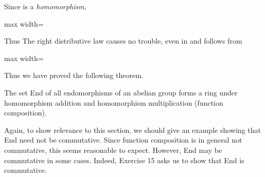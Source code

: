 \documentclass[11pt,oneside]{article}
\begin{document}
\begin{BookBody}
\noindent Since \BookInline{\theta } is a\textit{ homomorphism,}

\begin{center}\begin{adjustbox}{max width=\linewidth}\end{adjustbox}\end{center}

\noindent Thus  The right distributive law causes no trouble, even in  and follows from

\begin{center}\begin{adjustbox}{max width=\linewidth}\end{adjustbox}\end{center}

\noindent Thus we have proved the following theorem.

 The set End of all endomorphisms of an abelian group  forms a ring under homomorphism addition and homomorphism multiplication (function composition).

Again, to show relevance to this section, we should give an example showing that End need not be commutative. Since function composition is in general not commutative, this seems reasonable to expect. However, End may be commutative in some cases. Indeed, Exercise 15 asks us to show that End is commutative.

\end{BookBody}

\BookNarrativetrue
\end{document}
